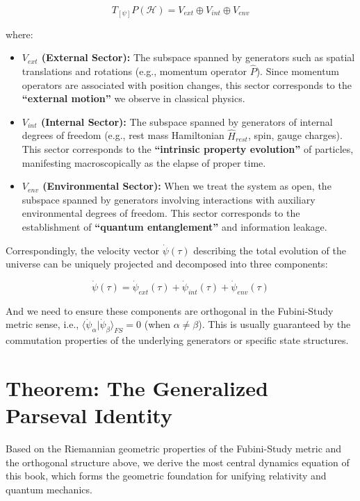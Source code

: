 $$T_{[\psi]}P(\mathcal{H}) = V_{ext} \oplus V_{int} \oplus V_{env}$$

where:

\begin{itemize}
\item \textbf{$V_{ext}$ (External Sector):} The subspace spanned by generators such as spatial translations and rotations (e.g., momentum operator \textbf{$\hat{P}$}). Since momentum operators are associated with position changes, this sector corresponds to the \textbf{``external motion''} we observe in classical physics.

\item \textbf{$V_{int}$ (Internal Sector):} The subspace spanned by generators of internal degrees of freedom (e.g., rest mass Hamiltonian \textbf{$\hat{H}_{rest}$}, spin, gauge charges). This sector corresponds to the \textbf{``intrinsic property evolution''} of particles, manifesting macroscopically as the elapse of proper time.

\item \textbf{$V_{env}$ (Environmental Sector):} When we treat the system as open, the subspace spanned by generators involving interactions with auxiliary environmental degrees of freedom. This sector corresponds to the establishment of \textbf{``quantum entanglement''} and information leakage.
\end{itemize}

Correspondingly, the velocity vector \textbf{$\dot{\psi}(\tau)$} describing the total evolution of the universe can be uniquely projected and decomposed into three components:

$$\dot{\psi}(\tau) = \dot{\psi}_{ext}(\tau) + \dot{\psi}_{int}(\tau) + \dot{\psi}_{env}(\tau)$$

And we need to ensure these components are orthogonal in the Fubini-Study metric sense, i.e., \textbf{$\langle \dot{\psi}_{\alpha} | \dot{\psi}_{\beta} \rangle_{FS} = 0$} (when \textbf{$\alpha \neq \beta$}). This is usually guaranteed by the commutation properties of the underlying generators or specific state structures.

\section{Theorem: The Generalized Parseval Identity}

Based on the Riemannian geometric properties of the Fubini-Study metric and the orthogonal structure above, we derive the most central dynamics equation of this book, which forms the geometric foundation for unifying relativity and quantum mechanics.

